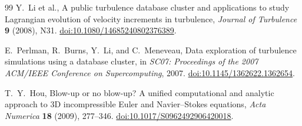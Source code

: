 \documentclass[11pt]{article}
\begin{document}
\begin{thebibliography}{99}
Y.~Li et al.,
A public turbulence database cluster and applications to study Lagrangian
evolution of velocity increments in turbulence,
\emph{Journal of Turbulence} \textbf{9} (2008), N31.
\href{https://doi.org/10.1080/14685240802376389}{doi:10.1080/14685240802376389}.

E.~Perlman, R.~Burns, Y.~Li, and C.~Meneveau,
Data exploration of turbulence simulations using a database cluster,
in \emph{SC07: Proceedings of the 2007 ACM/IEEE Conference on
Supercomputing}, 2007.
\href{https://doi.org/10.1145/1362622.1362654}{doi:10.1145/1362622.1362654}.

T.~Y.~Hou,
Blow-up or no blow-up? A unified computational and analytic approach to
3D incompressible Euler and Navier--Stokes equations,
\emph{Acta Numerica} \textbf{18} (2009), 277--346.
\href{https://doi.org/10.1017/S0962492906420018}{doi:10.1017/S0962492906420018}.

\end{thebibliography}
\end{document}
